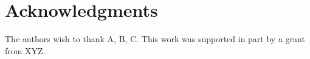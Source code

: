\documentclass{egpubl}
\begin{document}
	
	
	
	\section*{Acknowledgments}
		The authors wish to thank A, B, C. This work was supported in part by
		a grant from XYZ.
	
	
%	
	
	
\end{document}
